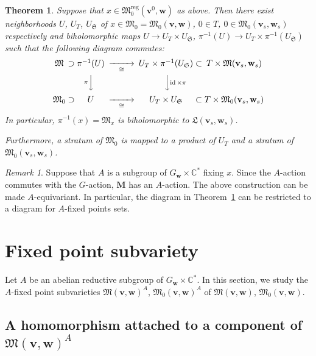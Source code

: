 \documentclass[12pt]{amsart}
\def\Bbb{\mathbb}
\def\frak{\mathfrak}
\newcommand{\rom}{\textup}
\newtheorem{Theorem}[equation]{Theorem}
\theoremstyle{definition}
\theoremstyle{remark}
\newtheorem{Remark}[equation]{Remark}
\numberwithin{equation}{subsection}
\newcommand{\thmref}[1]{Theorem~\ref{#1}}
\newcommand{\C}{{\Bbb C}}
\newcommand{\bM}{{\mathbf M}} %
\newcommand{\M}{{\frak M}} %
\newcommand{\Mreg}{{\frak M_0^{\operatorname{reg}}}}
\newcommand{\La}{{\frak L}} %
\newcommand{\bv}{{\mathbf v}} %
\newcommand{\bw}{{\mathbf w}} %
\begin{document}
\begin{Theorem}\label{thm:slice}
Suppose that $x\in\Mreg(\bv^0,\bw)$ as above.
%
Then there exist neighborhoods $U$, $U_T$, $U_{\mathfrak S}$ of
$x\in\M_0 = \M_0(\bv,\bw)$,
$0\in T$,
$0\in\M_0(\bv_s,\bw_s)$ respectively
and biholomorphic maps $U\to U_T\times U_{\mathfrak S}$,
$\pi^{-1}(U)\to U_T\times {\pi}^{-1}(U_{\mathfrak S})$
such that the following diagram commutes\rom:
\begin{equation*}
\begin{CD}
  \M \;@. \supset \; @.
   \pi^{-1}(U) @>>\cong> U_T \times \pi^{-1}(U_{\mathfrak S})
     \;@.\subset \;@. T\times \M(\bv_s,\bw_s)
\\
%
   @. @. @V{\pi}VV @VV{\operatorname{id}\times\pi}V @.@. \\
%
   \M_0\;@.\supset \; @.
   U @>>\cong> U_T\times U_{\mathfrak S}
                  \;@.\subset \;@. T\times\M_0(\bv_s,\bw_s)
\end{CD}
\end{equation*}
In particular, $\pi^{-1}(x) = \M_x$ is biholomorphic to
$\La(\bv_s,\bw_s)$.

Furthermore, a stratum of $\M_0$ is mapped to a product of $U_T$ and a 
stratum of $\M_0(\bv_s,\bw_s)$.
\end{Theorem}

\begin{Remark}\label{rem:Aslice}
Suppose that $A$ is a subgroup of $G_\bw\times\C^*$ fixing $x$. Since
the $A$-action commutes with the $G$-action, $\widehat\bM$ has an
$A$-action. The above construction can be made $A$-equivariant.
%
In particular, the diagram in \thmref{thm:slice} can be restricted to
a diagram for $A$-fixed points sets.
\end{Remark}

\section{Fixed point subvariety}\label{sec:Fixed}

Let $A$ be an abelian reductive subgroup of $G_\bw\times\C^*$. In this 
section, we study the $A$-fixed point subvarieties
$\M(\bv,\bw)^A$, $\M_0(\bv,\bw)^A$ of $\M(\bv,\bw)$, $\M_0(\bv,\bw)$.

\subsection{A homomorphism attached to a component of $\M(\bv,\bw)^A$}
\label{subsec:fix_hom}
\end{document}

